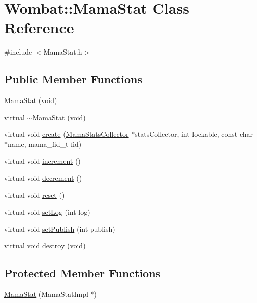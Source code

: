 \hypertarget{classWombat_1_1MamaStat}{
\section{Wombat::MamaStat Class Reference}
\label{classWombat_1_1MamaStat}
}


{\ttfamily \#include $<$MamaStat.h$>$}\subsection*{Public Member Functions}
\begin{DoxyCompactItemize}
\item 
\hyperlink{classWombat_1_1MamaStat_ab6c402a2fce830b3912247bbfc9ca412}{MamaStat} (void)
\item 
virtual \hyperlink{classWombat_1_1MamaStat_a31c23e8b7fdaad3881389575023463dd}{$\sim$MamaStat} (void)
\item 
virtual void \hyperlink{classWombat_1_1MamaStat_a8a7883f682cebd4b9a23ee1a7723c4e0}{create} (\hyperlink{classWombat_1_1MamaStatsCollector}{MamaStatsCollector} $\ast$statsCollector, int lockable, const char $\ast$name, mama\_\-fid\_\-t fid)
\item 
virtual void \hyperlink{classWombat_1_1MamaStat_abcac6508e2c63b05c75fce7b376f12a9}{increment} ()
\item 
virtual void \hyperlink{classWombat_1_1MamaStat_a83e3448bb3580076b5957d18fc9743d1}{decrement} ()
\item 
virtual void \hyperlink{classWombat_1_1MamaStat_a0ae9a2c4980dc05186e425e27b330fc5}{reset} ()
\item 
virtual void \hyperlink{classWombat_1_1MamaStat_a8a88566ebc8eeb5ef4a6104d986d76ea}{setLog} (int log)
\item 
virtual void \hyperlink{classWombat_1_1MamaStat_ac9e99afa55e2aab193a6df63b2f8292b}{setPublish} (int publish)
\item 
virtual void \hyperlink{classWombat_1_1MamaStat_abb50ba66e7012112d4370b71d2563bd1}{destroy} (void)
\end{DoxyCompactItemize}
\subsection*{Protected Member Functions}
\begin{DoxyCompactItemize}
\item 
\hyperlink{classWombat_1_1MamaStat_ab9b0ff4cfe6faf1833313530a2971979}{MamaStat} (MamaStatImpl $\ast$)
\end{DoxyCompactItemize}
